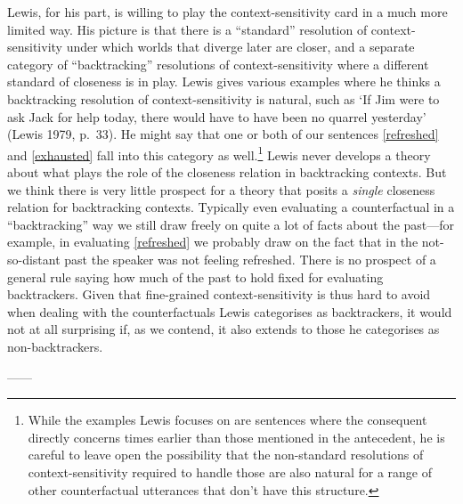 \documentclass[If.tex]{subfiles}
\begin{document}
Lewis, for his part, is willing to play the context-sensitivity card in a much more limited way. His picture is that there is a “standard” resolution of context-sensitivity under which worlds that diverge later are closer, and a separate category of “backtracking” resolutions of context-sensitivity where a different standard of closeness is in play. Lewis gives various examples where he thinks a backtracking resolution of context-sensitivity is natural, such as ‘If Jim were to ask Jack for help today, there would have to have been no quarrel yesterday’ (Lewis 1979, p.~33). He might say that one or both of our sentences \ref{refreshed} and \ref{exhausted} fall into this category as well.\footnote{While the examples Lewis focuses on are sentences where the consequent directly concerns times earlier than those mentioned in the antecedent, he is careful to leave open the possibility that the non-standard resolutions of context-sensitivity required to handle those are also natural for a range of other counterfactual utterances that don't have this structure.} Lewis never develops a theory about what plays the role of the closeness relation in backtracking contexts. But we think there is very little prospect for a theory that posits a \emph{single} closeness relation for backtracking contexts. Typically even evaluating a counterfactual in a “backtracking” way we still draw freely on quite a lot of facts about the past---for example, in evaluating \ref{refreshed} we probably draw on the fact that in the not-so-distant past the speaker was not feeling refreshed. There is no prospect of a general rule saying how much of the past to hold fixed for evaluating backtrackers. Given that fine-grained context-sensitivity is thus hard to avoid when dealing with the counterfactuals Lewis categorises as backtrackers, it would not at all surprising if, as we contend, it also extends to those he categorises as non-backtrackers.

------
\end{document}
